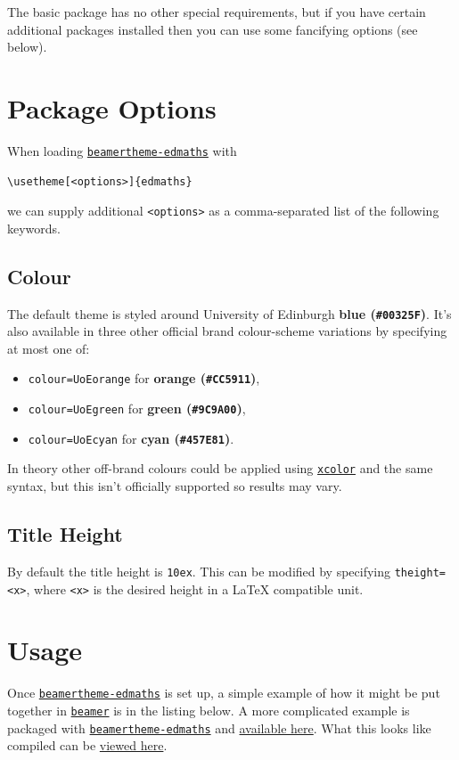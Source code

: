 \documentclass[12pt]{article}
\newcommand\pkg[1]{\href{https://www.ctan.org/pkg/#1}{\color{teal}\lstinline{#1}}}
\newcommand\key[1]{{\color{orange}\lstinline|#1|}}
\begin{document}
The basic package has no other special requirements, but if you have certain additional packages installed then you can use some fancifying options (see below).

\section{Package Options}

When loading \pkg{beamertheme-edmaths} with
\begin{lstlisting}
\usetheme[<options>]{edmaths}
\end{lstlisting}
we can supply additional \key{<options>} as a comma-separated list of the following keywords.

\subsection{Colour}

The default theme is styled around University of Edinburgh {\bf\color[HTML]{00325F} blue (\lstinline|#00325F|)}. It's also available in three other official brand colour-scheme variations by specifying at most one of:
\begin{itemize}
    \item \key{colour=UoEorange} for {\bf\color[HTML]{CC5911} orange (\lstinline|#CC5911|)},
    \item \key{colour=UoEgreen} for {\bf\color[HTML]{9C9A00} green (\lstinline|#9C9A00|)},
    \item \key{colour=UoEcyan} for {\bf\color[HTML]{457E81} cyan (\lstinline|#457E81|)}.
\end{itemize}
In theory other off-brand colours could be applied using \pkg{xcolor} and the same syntax, but this isn't officially supported so results may vary.

\subsection{Title Height}

By default the title height is \key{10ex}. This can be modified by specifying \key{theight=<x>}, where \key{<x>} is the desired height in a \LaTeX{} compatible unit.

\section{Usage}

Once \pkg{beamertheme-edmaths} is set up, a simple example of how it might be put together in \pkg{beamer} is in the listing below. A more complicated example is packaged with \pkg{beamertheme-edmaths} and \href{https://github.com/UoE-School-of-Mathematics/LaTeX-Templates/blob/main/example-presentation.tex}{available here}. What this looks like compiled can be \href{https://UoE-School-of-Mathematics.github.io/LaTeX-Templates/example-presentation.pdf}{viewed here}.
\end{document}
